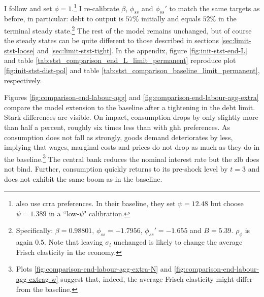 \documentclass[a4paper,12pt]{article} %
\numberwithin{equation}{section} %
\numberwithin{figure}{section}
\numberwithin{table}{section}
\begin{document}
I follow \textcite{mckay2016} and set $\phi=1$.\footnote{\textcite{gl2017} also use \Gls{crra} preferences. In their baseline, they set $\psi = 12.48$ but choose $\psi = 1.389$ in a ``low-$\psi$" calibration.} I re-calibrate $\beta$, $\phi_{ss}$ and $\phi_{ss}'$ to match the same targets as before, in particular: debt to output is $57\%$ initially and equals $52\%$ in the terminal steady state.\footnote{Specifically: $\beta = 0.98801$, $\phi_{ss} = -1.7956$, $\phi_{ss}' = -1.655$ and $B = 5.39$. $\rho_{\phi}$ is again $0.5$. Note that leaving $\sigma_l$ unchanged is likely to change the average Frisch elasticity in the economy.} The rest of the model remains unchanged, but of course the steady states can be quite different to those described in sections \ref{sec:limit-stst-loose} and \ref{sec:limit-stst-tight}. In the appendix, figure \ref{fig:init-stst-end-L} and table \ref{tab:stst_comparison_end_L_limit_permanent} reproduce plot \ref{fig:init-stst-dist-pol} and table \ref{tab:stst_comparison_baseline_limit_permanent}, respectively.

Figures \ref{fig:comparison-end-labour-agg} and \ref{fig:comparison-end-labour-agg-extra} compare the model extension to the baseline after a tightening in the debt limit. Stark differences are visible. On impact, consumption drops by only slightly more than half a percent, roughly six times less than with \Gls{ghh} preferences. As consumption does not fall as strongly, goods demand deteriorates by less, implying that wages, marginal costs and prices do not drop as much as they do in the baseline.\footnote{Plots \ref{fig:comparison-end-labour-agg-extra-N} and \ref{fig:comparison-end-labour-agg-extrag-w} suggest that, indeed, the average Frisch elasticity might differ from the baseline.} The central bank reduces the nominal interest rate but the \Gls{zlb} does not bind. Further, consumption quickly returns to its pre-shock level by $t=3$ and does not exhibit the same boom as in the baseline. 
\end{document}
